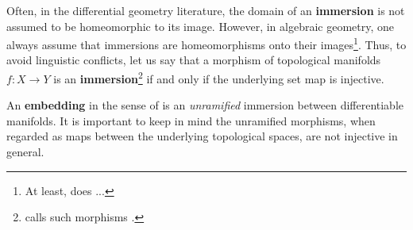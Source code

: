         \begin{convention}[Immersions]
            Often, in the differential geometry literature, the domain of an \textbf{immersion} is not assumed to be homeomorphic to its image. However, in algebraic geometry, one always assume that immersions are homeomorphisms onto their images\footnote{At least, \cite{stacks} does ...}. Thus, to avoid linguistic conflicts, let us say that a morphism of topological manifolds $f: X \to Y$ is an \textbf{immersion}\footnote{\cite{lee_smooth_manifolds} calls such morphisms .} if and only if the underlying set map is injective.
            
            An \textbf{embedding} in the sense of \cite{lee_smooth_manifolds} is an \textit{unramified} immersion between differentiable manifolds. It is important to keep in mind the unramified morphisms, when regarded as maps between the underlying topological spaces, are not injective in general.
        \end{convention}